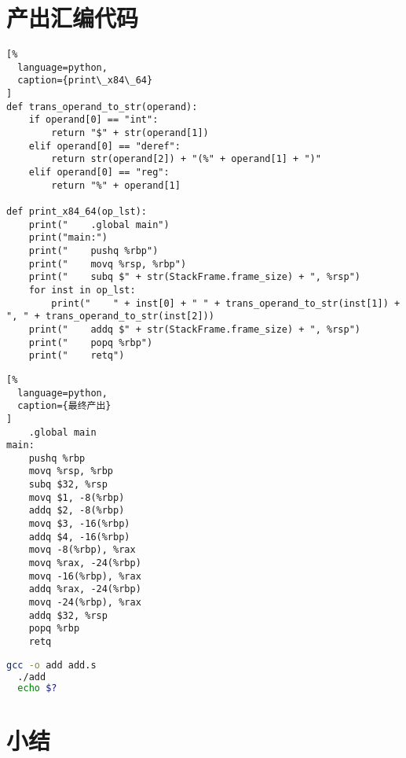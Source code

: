 \section{产出汇编代码}

\begin{lstlisting}[%
  language=python,
  caption={print\_x84\_64}
]
def trans_operand_to_str(operand):
    if operand[0] == "int":
        return "$" + str(operand[1])
    elif operand[0] == "deref":
        return str(operand[2]) + "(%" + operand[1] + ")"
    elif operand[0] == "reg":
        return "%" + operand[1]

def print_x84_64(op_lst):
    print("    .global main")
    print("main:")
    print("    pushq %rbp")
    print("    movq %rsp, %rbp")
    print("    subq $" + str(StackFrame.frame_size) + ", %rsp")
    for inst in op_lst:
        print("    " + inst[0] + " " + trans_operand_to_str(inst[1]) + ", " + trans_operand_to_str(inst[2]))
    print("    addq $" + str(StackFrame.frame_size) + ", %rsp")
    print("    popq %rbp")
    print("    retq")
\end{lstlisting}

\begin{lstlisting}[%
  language=python,
  caption={最终产出}
]
    .global main
main:
    pushq %rbp
    movq %rsp, %rbp
    subq $32, %rsp
    movq $1, -8(%rbp)
    addq $2, -8(%rbp)
    movq $3, -16(%rbp)
    addq $4, -16(%rbp)
    movq -8(%rbp), %rax
    movq %rax, -24(%rbp)
    movq -16(%rbp), %rax
    addq %rax, -24(%rbp)
    movq -24(%rbp), %rax
    addq $32, %rsp
    popq %rbp
    retq
\end{lstlisting}


\begin{lstlisting}[language=bash,style=shellstyle]
  gcc -o add add.s
  ./add
  echo $?
\end{lstlisting}

\section{小结}
